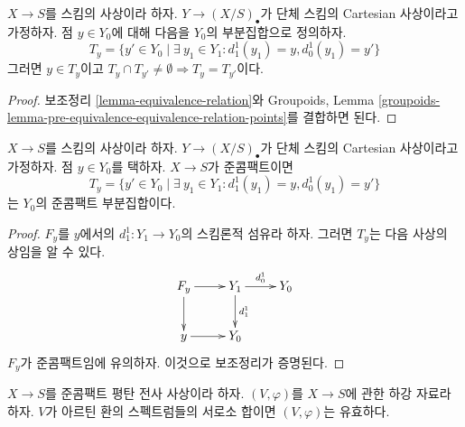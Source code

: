 \begin{lemma}
\label{lemma-equivalence-classes-points}
$X \to S$를 스킴의 사상이라 하자. $Y \to (X/S)_\bullet$가
단체 스킴의 Cartesian 사상이라고 가정하자. 점 $y \in Y_0$에 대해
다음을 $Y_0$의 부분집합으로 정의하자.
$$
T_y = \{y' \in Y_0 \mid \exists\ y_1 \in Y_1:
d^1_1(y_1) = y, d^1_0(y_1) = y'\}
$$
그러면 $y \in T_y$이고
$T_y \cap T_{y'} \not = \emptyset \Rightarrow T_y = T_{y'}$이다.
\end{lemma}

\begin{proof}
보조정리 \ref{lemma-equivalence-relation}와
Groupoids, Lemma
\ref{groupoids-lemma-pre-equivalence-equivalence-relation-points}를
결합하면 된다.
\end{proof}

\begin{lemma}
\label{lemma-quasi-compact}
$X \to S$를 스킴의 사상이라 하자.
$Y \to (X/S)_\bullet$가 단체 스킴의 Cartesian 사상이라고 가정하자.
점 $y \in Y_0$를 택하자. $X \to S$가 준콤팩트이면
$$
T_y = \{y' \in Y_0 \mid \exists\ y_1 \in Y_1:
d^1_1(y_1) = y, d^1_0(y_1) = y'\}
$$
는 $Y_0$의 준콤팩트 부분집합이다.
\end{lemma}

\begin{proof}
$F_y$를 $y$에서의 $d^1_1 : Y_1 \to Y_0$의 스킴론적 섬유라 하자.
그러면 $T_y$는 다음 사상의 상임을 알 수 있다.
$$
\xymatrix{
F_y \ar[r] \ar[d] &
Y_1 \ar[r]^{d^1_0} \ar[d]^{d^1_1} &
Y_0 \\
y \ar[r] &
Y_0 &
}
$$
$F_y$가 준콤팩트임에 유의하자. 이것으로 보조정리가 증명된다.
\end{proof}

\begin{lemma}
\label{lemma-descent-disjoint-union-Artinian-along-fields}
$X \to S$를 준콤팩트 평탄 전사 사상이라 하자.
$(V, \varphi)$를 $X \to S$에 관한 하강 자료라 하자.
$V$가 아르틴 환의 스펙트럼들의 서로소 합이면 $(V, \varphi)$는 유효하다.
\end{lemma}

